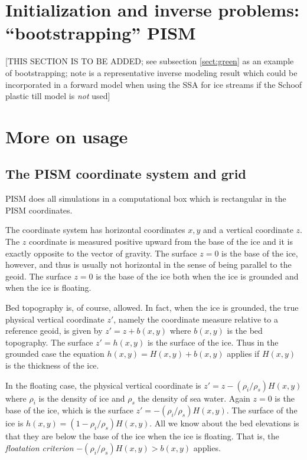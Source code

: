 \documentclass[11pt,final]{amsart}
\begin{document}
\section{Initialization and inverse problems: ``bootstrapping'' PISM}\label{sect:boot}  [THIS SECTION IS TO BE ADDED; see subsection \ref{sect:green} as an example of bootstrapping;  note \cite{JoughinMacAyealTulaczyk} is a representative inverse modeling result which could be incorporated in a forward model when using the SSA for ice streams if the Schoof plastic till model is \emph{not} used]


\clearpage
\newpage
\section{More on usage}\label{sect:usage}

\subsection{The PISM coordinate system and grid} \label{subsect:coords} PISM does all simulations in a computational box which is rectangular in the PISM coordinates.

The coordinate system has horizontal coordinates $x,y$ and a vertical coordinate $z$.  The $z$ coordinate is measured positive upward from the base of the ice and it is exactly opposite to the vector of gravity.  The surface $z=0$ is the base of the ice, however, and thus is usually not horizontal in the sense of being parallel to the geoid.   The surface $z=0$ is the base of the ice both when the ice is grounded and when the ice is floating.

Bed topography is, of course, allowed.  In fact, when the ice is grounded, the true physical vertical coordinate $z'$, namely the coordinate measure relative to a reference geoid, is given by $z'=z+b(x,y)$ where $b(x,y)$ is the bed topography.  The surface $z'=h(x,y)$ is the surface of the ice.  Thus in the grounded case the equation $h(x,y)=H(x,y)+b(x,y)$ applies if $H(x,y)$ is the thickness of the ice.

In the floating case, the physical vertical coordinate is $z'=z-(\rho_i/\rho_s) H(x,y)$ where $\rho_i$ is the density of ice and $\rho_s$ the density of sea water.  Again $z=0$ is the base of the ice, which is the surface $z' = -(\rho_i/\rho_s) H(x,y)$.  The surface of the ice is $h(x,y) = (1-\rho_i/\rho_s) H(x,y)$.  All we know about the bed elevations is that they are below the base of the ice when the ice is floating.  That is, the \emph{floatation criterion} $-(\rho_i/\rho_s) H(x,y) > b(x,y)$ applies.
\end{document}
